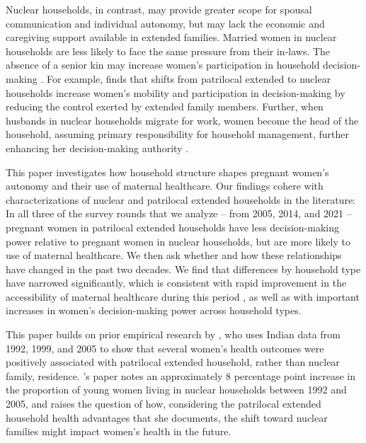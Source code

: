 \documentclass[10pt,twoside,reqno]{article}
\begin{document}
Nuclear households, in contrast, may provide greater scope for spousal communication and individual autonomy, but may lack the economic and caregiving support available in extended families. Married women in nuclear households are less likely to face the same pressure from their in-laws. The absence of a senior kin may increase women’s participation in household decision-making \citep{simkhada2010role,char2010influence}. For example, \cite{mookerjee2019gender} finds that shifts from patrilocal extended to nuclear households increase women’s mobility and participation in decision-making by reducing the control exerted by extended family members. Further, when husbands in nuclear households migrate for work, women become the head of the household, assuming primary responsibility for  household management, further enhancing her decision-making authority \citep{desai2008negotiated}. 

This paper investigates how household structure shapes pregnant women's autonomy and their use of maternal healthcare.  Our findings cohere with characterizations of nuclear and patrilocal extended households in the literature: In all three of the survey rounds that we analyze -- from 2005, 2014, and 2021 -- pregnant women in patrilocal extended households have less decision-making power relative to pregnant women in nuclear households, but are more likely to use of maternal healthcare.  We then ask whether and how these relationships have changed in the past two decades.  We find that differences by household type have narrowed significantly, which is consistent with rapid improvement in the accessibility of maternal healthcare during this period \citep{gandhi2022predictors, rai2022use}, as well as with important increases in women's decision-making power across household types.

This paper builds on prior empirical research by \cite{allendorf2013going}, who uses Indian data from 1992, 1999, and 2005 to show that several women's health outcomes were positively associated with patrilocal extended household, rather than nuclear family, residence.  \cite{allendorf2013going}'s paper notes an approximately 8 percentage point increase in the proportion of young women living in nuclear households between 1992 and 2005, and raises the question of how, considering the patrilocal extended household health advantages that she documents, the shift toward nuclear families might impact women's health in the future.  
\end{document}
